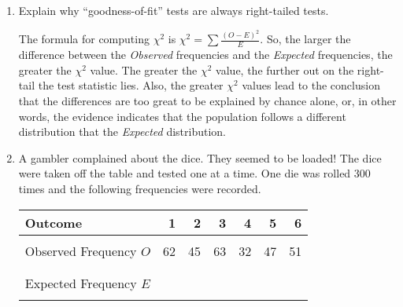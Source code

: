 \documentclass{article}
\begin{document}
\newcommand{\answer}[1]{\color{red}#1}

\pagestyle{myheadings}

\begin{center}
\textbf{}
\end{center}

\begin{enumerate}

\item Explain why ``goodness-of-fit'' tests are always right-tailed tests. 

{\answer
The formula for computing $\chi^2$ is $ \chi^2 = \sum \frac{(O-E)^2}{E}$.  So, the larger the difference between the {\em Observed} frequencies and the {\em Expected} frequencies, the greater the $\chi^2$ value.  The greater the $\chi^2$ value, the further out on the right-tail the test statistic lies.  Also, the greater $\chi^2$ values lead to the conclusion that the differences are too great to be explained by chance alone, or, in other words, the evidence indicates that the population follows a different distribution that the {\em Expected} distribution.
}


\item A gambler complained about the dice.  They seemed to be loaded!  The dice were taken off the table and tested one at a time.  One die was rolled 300 times and the following frequencies were recorded. \\
\begin{tabular}{l||rrrrrr}
\hline
Outcome & 1 & 2 & 3 & 4 & 5 & 6 \\
\hline
&&&&&& \\
Observed Frequency $O$ &  62 & 45 & 63 & 32 & 47 & 51 \\
&&&&&& \\
\hline
&&&&&& \\
Expected Frequency $E$ &\hspace{0.5cm}{\answer 50} &\hspace{0.5cm}{\answer 50} &\hspace{0.5cm}{\answer 50} &\hspace{0.5cm}{\answer 50} &\hspace{0.5cm}{\answer 50} &\hspace{0.5cm}{\answer 50}  \\
&&&&&& \\
\hline
\end{tabular}


\end{enumerate}
\end{document}
